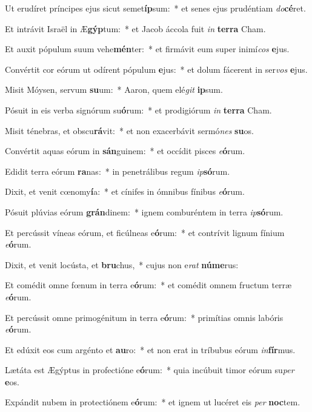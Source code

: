 \item Ut erudíret príncipes ejus sicut semet\textbf{íp}sum:~* et senes ejus prudéntiam \textit{do}\textbf{cé}ret.
\item Et intrávit Israël in Æ\textbf{gýp}tum:~* et Jacob áccola fuit \textit{in} \textbf{ter}\textbf{ra} Cham.
\item Et auxit pópulum suum vehe\textbf{mén}ter:~* et firmávit eum super inimí\textit{cos} \textbf{e}jus.
\item Convértit cor eórum ut odírent pópulum \textbf{e}jus:~* et dolum fácerent in ser\textit{vos} \textbf{e}jus.
\item Misit Móysen, servum \textbf{su}um:~* Aaron, quem elé\textit{git} \textbf{ip}sum.
\item Pósuit in eis verba signórum su\textbf{ó}rum:~* et prodigiórum \textit{in} \textbf{ter}\textbf{ra} Cham.
\item Misit ténebras, et obscu\textbf{rá}vit:~* et non exacerbávit sermó\textit{nes} \textbf{su}os.
\item Convértit aquas eórum in \textbf{sán}guinem:~* et occídit pisces \textit{e}\textbf{ó}rum.
\item Edidit terra eórum \textbf{ra}nas:~* in penetrálibus regum \textit{ip}\textbf{só}rum.
\item Dixit, et venit cœnomy\textbf{í}a:~* et cínifes in ómnibus fínibus \textit{e}\textbf{ó}rum.
\item Pósuit plúvias eórum \textbf{grán}dinem:~* ignem comburéntem in terra \textit{ip}\textbf{só}rum.
\item Et percússit víneas eórum, et ficúlneas e\textbf{ó}rum:~* et contrívit lignum fínium \textit{e}\textbf{ó}rum.
\item Dixit, et venit locústa, et \textbf{bru}chus,~* cujus non e\textit{rat} \textbf{nú}\textbf{me}rus:
\item Et comédit omne fœnum in terra e\textbf{ó}rum:~* et comédit omnem fructum terræ \textit{e}\textbf{ó}rum.
\item Et percússit omne primogénitum in terra e\textbf{ó}rum:~* primítias omnis labóris \textit{e}\textbf{ó}rum.
\item Et edúxit eos cum argénto et \textbf{au}ro:~* et non erat in tríbubus eórum \textit{in}\textbf{fír}mus.
\item Lætáta est Ægýptus in profectióne e\textbf{ó}rum:~* quia incúbuit timor eórum su\textit{per} \textbf{e}os.
\item Expándit nubem in protectiónem e\textbf{ó}rum:~* et ignem ut lucéret eis \textit{per} \textbf{noc}tem.
